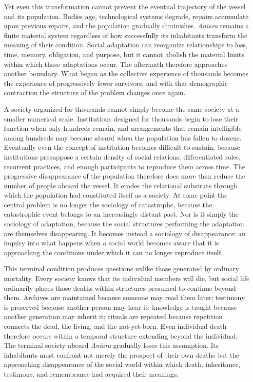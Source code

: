 \documentclass[11pt,oneside]{book}
\theoremstyle{definition}
\theoremstyle{remark}
\begin{document}
Yet even this transformation cannot prevent the eventual trajectory of the vessel and its population. Bodies age, technological systems degrade, repairs accumulate upon previous repairs, and the population gradually diminishes. \emph{Aniara} remains a finite material system regardless of how successfully its inhabitants transform the meaning of their condition. Social adaptation can reorganize relationships to loss, time, memory, obligation, and purpose, but it cannot abolish the material limits within which those adaptations occur. The aftermath therefore approaches another boundary. What began as the collective experience of thousands becomes the experience of progressively fewer survivors, and with that demographic contraction the structure of the problem changes once again.

A society organized for thousands cannot simply become the same society at a smaller numerical scale. Institutions designed for thousands begin to lose their function when only hundreds remain, and arrangements that remain intelligible among hundreds may become absurd when the population has fallen to dozens. Eventually even the concept of institution becomes difficult to sustain, because institutions presuppose a certain density of social relations, differentiated roles, recurrent practices, and enough participants to reproduce them across time. The progressive disappearance of the population therefore does more than reduce the number of people aboard the vessel. It erodes the relational substrate through which the population had constituted itself as a society. At some point the central problem is no longer the sociology of catastrophe, because the catastrophic event belongs to an increasingly distant past. Nor is it simply the sociology of adaptation, because the social structures performing the adaptation are themselves disappearing. It becomes instead a sociology of disappearance: an inquiry into what happens when a social world becomes aware that it is approaching the conditions under which it can no longer reproduce itself.

This terminal condition produces questions unlike those generated by ordinary mortality. Every society knows that its individual members will die, but social life ordinarily places those deaths within structures presumed to continue beyond them. Archives are maintained because someone may read them later; testimony is preserved because another person may hear it; knowledge is taught because another generation may inherit it; rituals are repeated because repetition connects the dead, the living, and the not-yet-born. Even individual death therefore occurs within a temporal structure extending beyond the individual. The terminal society aboard \emph{Aniara} gradually loses this assumption. Its inhabitants must confront not merely the prospect of their own deaths but the approaching disappearance of the social world within which death, inheritance, testimony, and remembrance had acquired their meanings.
\end{document}
